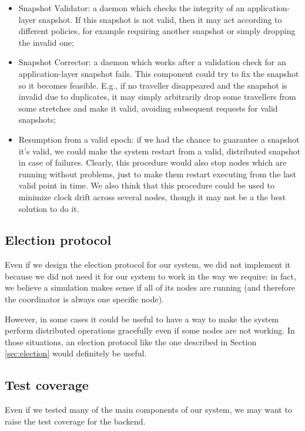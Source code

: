 \begin{itemize}
  \item Snapshot Validator: a daemon which checks the integrity of an
        application-layer snapshot. If this snapshot is not valid, then it may
        act according to different policies, for example requiring another
        snapshot or simply dropping the invalid one;
  \item Snapshot Corrector: a daemon which works after a validation check for
        an application-layer snapshot fails. This component could try to fix
        the snapshot so it becomes feasible. E.g., if no traveller disappeared
        and the snapshot is invalid due to duplicates, it may simply
        arbitrarily drop some travellers from some stretches and make it valid,
        avoiding subsequent requests for valid snapshots;
  \item Resumption from a valid epoch: if we had the chance to guarantee a
        snapshot it's valid, we could make the system restart from a valid,
        distributed snapshot in case of failures. Clearly, this procedure would
        also stop nodes which are running without problems, just to make them
        restart executing from the last valid point in time.
        We also think that this procedure could be used to minimize clock
        drift across several nodes, though it may not be a the best solution
        to do it.
\end{itemize}

\subsection{Election protocol}
Even if we design the election protocol for our system, we did not implement it
because we did not need it for our system to work in the way we require: in
fact, we believe a simulation makes sense if all of its nodes are running (and
therefore the coordinator is always one specific node).

However, in some cases it could be useful to have a way to make the system
perform distributed operations gracefully even if some nodes are not working.
In those situations, an election protocol like the one described in Section
\ref{sec:election} would definitely be useful.

\subsection{Test coverage}
Even if we tested many of the main components of our system, we may want to
raise the test coverage for the backend.

